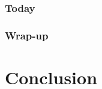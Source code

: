 \documentclass[twocolumn]{article}
\begin{document}
			
			\subsubsection{Today}
			
			
			\subsubsection{Wrap-up}
			
			


	\clearpage
	\section{Conclusion}

	

	
	\clearpage
	\begin{strip}
		\begin{appendix}
			 
			
		
			\listoffigures
		
			\listoftables
		\end{appendix}
	\end{strip}
\end{document}
